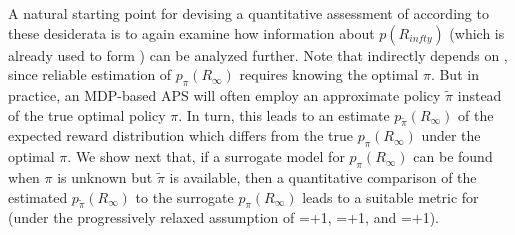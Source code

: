     
 A natural starting point for devising a quantitative assessment of \xQ{} according to these desiderata is to again examine how information about $p(R_{infty})$ (which is already used to form \xO{}) can be analyzed further. 
 Note that \xO{} indirectly depends on \xQ{}, since reliable estimation of $p_{\pi}(R_{\infty})$ requires knowing the optimal $\pi$. But in practice, an MDP-based APS will often employ an approximate policy $\tilde{\pi}$ instead of the true optimal policy $\pi$. In turn, this leads to an estimate $p_{\tilde{\pi}}(R_{\infty})$ of the expected reward distribution which differs from the true $p_{\pi}(R_{\infty})$ under the optimal $\pi$. We show next that, if a surrogate model for $p_{\pi}(R_{\infty})$ can be found when $\pi$ is unknown but $\tilde{\pi}$ is available, then a quantitative comparison of the estimated $p_{\tilde{\pi}}(R_{\infty})$ to the surrogate $p_{\pi}(R_{\infty})$ leads to a suitable metric for \xQ{} (under the progressively relaxed assumption of \xM{}=+1, \xP{}=+1, and \xI{}=+1). 
    
    

